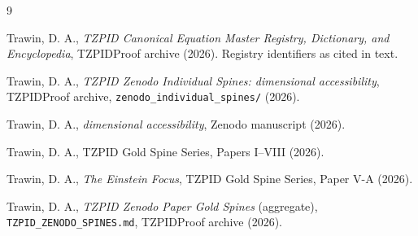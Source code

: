 \documentclass[11pt]{article}
\theoremstyle{remark}
\begin{document}
\begin{thebibliography}{9}

 Trawin, D. A., \emph{TZPID Canonical Equation Master Registry, Dictionary, and Encyclopedia}, TZPIDProof archive (2026). Registry identifiers as cited in text.

 Trawin, D. A., \emph{TZPID Zenodo Individual Spines: dimensional accessibility}, TZPIDProof archive, \texttt{zenodo\_individual\_spines/} (2026).

 Trawin, D. A., \emph{dimensional accessibility}, Zenodo manuscript (2026).

 Trawin, D. A., TZPID Gold Spine Series, Papers I--VIII (2026).

 Trawin, D. A., \emph{The Einstein Focus}, TZPID Gold Spine Series, Paper V-A (2026).

 Trawin, D. A., \emph{TZPID Zenodo Paper Gold Spines} (aggregate), \texttt{TZPID\_ZENODO\_SPINES.md}, TZPIDProof archive (2026).

\end{thebibliography}
\end{document}
